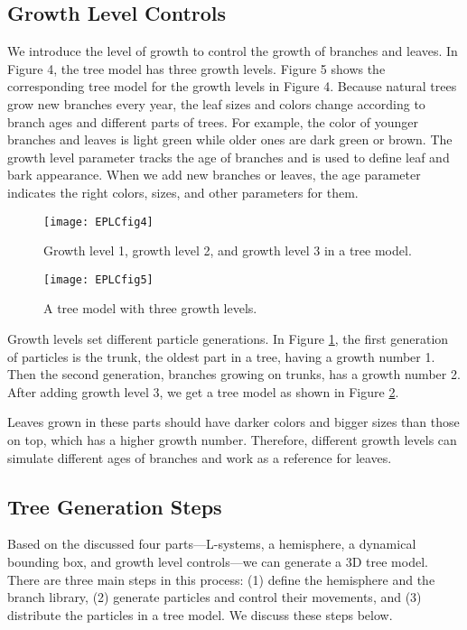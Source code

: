 \subsection{Growth Level Controls}

We introduce the level of growth to control the growth of branches and leaves. In Figure 4, the tree model has three growth levels. Figure 5 shows the corresponding tree model for the growth levels in Figure 4. Because natural trees grow new branches every year, the leaf sizes and colors change according to branch ages and different parts of trees. For example, the color of younger branches and leaves is light green while older ones are dark green or brown. The growth level parameter tracks the age of branches and is used to define leaf and bark appearance. When we add new branches or leaves, the age parameter indicates the right colors, sizes, and other parameters for them. 

\begin{figure}[!t]
\centering
\texttt{[image: EPLCfig4]}
\caption[Various growth levels. ]{Growth level 1, growth level 2, and growth level 3 in a tree model.}
\label{fig:EPLCfig4}
\end{figure}

\begin{figure}[!t]
\centering
\texttt{[image: EPLCfig5]}
\caption{A tree model with three growth levels.}
\label{fig:EPLCfig5}
\end{figure}
 
Growth levels set different particle generations. In Figure \ref{fig:EPLCfig4}, the first generation of particles is the trunk, the oldest part in a tree, having a growth number 1. Then the second generation, branches growing on trunks, has a growth number 2. After adding growth level 3, we get a tree model as shown in Figure \ref{fig:EPLCfig5}. 

Leaves grown in these parts should have darker colors and bigger sizes than those on top, which has a higher growth number. Therefore, different growth levels can simulate different ages of branches and work as a reference for leaves.

\subsection{Tree Generation Steps}

Based on the discussed four parts---L-systems, a hemisphere, a dynamical bounding box, and growth level controls---we can generate a 3D tree model. There are three main steps in this process: (1) define the hemisphere and the branch library, (2) generate particles and control their movements, and (3) distribute the particles in a tree model. We discuss these steps below.

